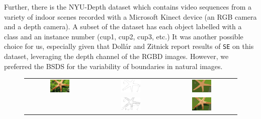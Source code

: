 Further, there is the NYU-Depth dataset \cite{Silberman2012} which contains video sequences from a variety of indoor scenes recorded with a Microsoft Kinect device (\ie an RGB camera and a depth camera). A subset of the dataset has each object labelled with a class and an instance number (\eg cup1, cup2, cup3, etc.) %
It was another possible choice for us, especially given that Doll{\'a}r and Zitnick report results of {\tt SE} on this dataset, leveraging the depth channel of the RGBD images. However, we preferred the BSDS for the variability of boundaries in natural images.

\begin{figure}[t]
\begin{center}
  \begin{tabular}{ c c c }
  \includegraphics[width=0.3\textwidth]{images/examples/starfish/starfish.png} &
  \includegraphics[width=0.3\textwidth,frame]{images/examples/starfish/starfish_bdry_coarse.png} &
  \includegraphics[width=0.3\textwidth]{images/examples/starfish/starfish_segm_coarse.png} \\
  &
  \includegraphics[width=0.3\textwidth,frame]{images/examples/starfish/starfish_bdry_detail.png} &
  \includegraphics[width=0.3\textwidth]{images/examples/starfish/starfish_segm_detail.png} \\

\end{tabular}
\end{center}
\end{figure}
